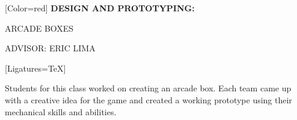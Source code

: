 \documentclass{article}
\begin{document}
{

	[Color=red]
	\fontsize{0.7in}{0.6in}\selectfont 
	\bfseries
	DESIGN AND PROTOTYPING: 

	\vspace{0.1in}

	ARCADE BOXES
}

\vspace{0.25in}

{
	\fontsize{0.4in}{0.4in}\selectfont
	ADVISOR: ERIC LIMA
}

\vspace{0.2in}

{
	[Ligatures=TeX]
	\fontsize{0.41in}{0.46in}\selectfont

	Students for this class worked on creating an arcade box. Each team came
	up with a creative idea for the game and created a working prototype using
	their mechanical skills and abilities.

}
\end{document}
